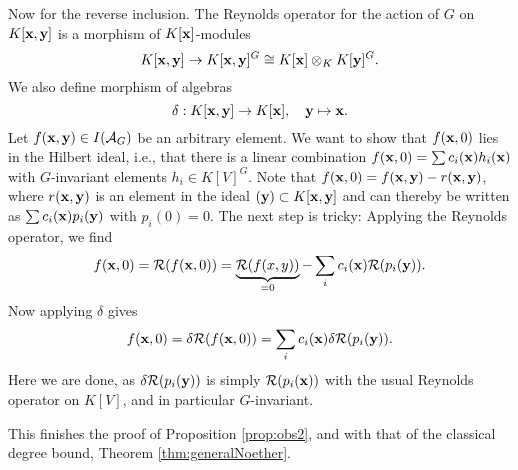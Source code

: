 \documentclass[../main.tex]{subfiles}
\begin{document}
Now for the reverse inclusion. The Reynolds operator for the action of $G$ on 
$K[\mathbf{x} ,\mathbf{y}]$ is a morphism of $K[\mathbf{x}]$-modules
\begin{equation*}
    K[\mathbf{x},\mathbf{y}] \to K[\mathbf{x}, \mathbf{y}]^G \cong K[\mathbf{x}] \otimes_K K[\mathbf{y}]^G.
\end{equation*}
We also define morphism of algebras
\begin{equation*}
    \delta: K[\mathbf{x},\mathbf{y}] \to K[\mathbf{x}], \quad \mathbf{y} \mapsto \mathbf{x}.
\end{equation*}
Let $f(\mathbf{x},\mathbf{y}) \in I(\mathcal{A}_G)$ be an arbitrary element. We want to show that 
$f(\mathbf{x},0)$ lies in the Hilbert ideal, i.e., that there is a linear combination
$f(\mathbf{x}, 0) = \sum c_i(\mathbf{x}) h_i(\mathbf{x})$ with $G$-invariant elements $h_i \in K[V]^G$. 
Note that $f(\mathbf{x},0) = f(\mathbf{x},\mathbf{y}) - r(\mathbf{x},\mathbf{y})$, where $r(\mathbf{x},\mathbf{y})$ is an element
in the ideal $(\mathbf{y}) \subset K[\mathbf{x},\mathbf{y}]$ and can thereby be written as $\sum
c_i(\mathbf{x})p_i(\mathbf{y})$ with $p_i(0) = 0$. The next step is tricky: Applying the
Reynolds operator, we find 
\begin{equation*}
    f(\mathbf{x}, 0) = \mathcal{R}(f(\mathbf{x},0)) = \underbrace{\mathcal{R}(f(x,y))}_{=0} - \sum_i c_i(\mathbf{x})
    \mathcal{R}(p_i(\mathbf{y})).
\end{equation*}
Now applying $\delta$ gives
\begin{equation*}
    f(\mathbf{x},0) = \delta \mathcal{R}(f(\mathbf{x},0)) = \sum_i c_i(\mathbf{x}) \delta \mathcal{R}(p_i(\mathbf{y})).
\end{equation*}
Here we are done, as $\delta \mathcal{R}(p_i(\mathbf{y}))$ is simply $\mathcal{R}(p_i(\mathbf{x}))$ with the 
usual Reynolds operator on $K[V]$, and in particular $G$-invariant. 

This finishes the proof of Proposition \ref{prop:obs2}, and with that of the
classical degree bound, Theorem \ref{thm:generalNoether}.
\end{document}
